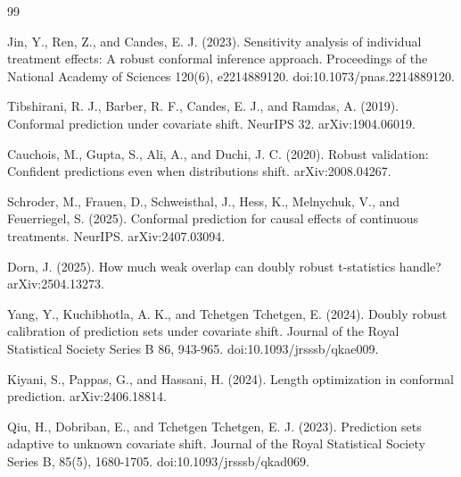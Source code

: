 \documentclass{article}
\begin{document}
\begin{thebibliography}{99}

   Jin, Y., Ren, Z., and Candes, E. J. (2023). Sensitivity analysis of individual treatment effects: A robust conformal inference approach. Proceedings of the National Academy of Sciences 120(6), e2214889120. doi:10.1073/pnas.2214889120.

   Tibshirani, R. J., Barber, R. F., Candes, E. J., and Ramdas, A. (2019). Conformal prediction under covariate shift. NeurIPS 32. arXiv:1904.06019.

   Cauchois, M., Gupta, S., Ali, A., and Duchi, J. C. (2020). Robust validation: Confident predictions even when distributions shift. arXiv:2008.04267.

   Schroder, M., Frauen, D., Schweisthal, J., Hess, K., Melnychuk, V., and Feuerriegel, S. (2025). Conformal prediction for causal effects of continuous treatments. NeurIPS. arXiv:2407.03094.

   Dorn, J. (2025). How much weak overlap can doubly robust t-statistics handle? arXiv:2504.13273.

   Yang, Y., Kuchibhotla, A. K., and Tchetgen Tchetgen, E. (2024). Doubly robust calibration of prediction sets under covariate shift. Journal of the Royal Statistical Society Series B 86, 943-965. doi:10.1093/jrsssb/qkae009.

   Kiyani, S., Pappas, G., and Hassani, H. (2024). Length optimization in conformal prediction. arXiv:2406.18814.

   Qiu, H., Dobriban, E., and Tchetgen Tchetgen, E. J. (2023). Prediction sets adaptive to unknown covariate shift. Journal of the Royal Statistical Society Series B, 85(5), 1680-1705. doi:10.1093/jrsssb/qkad069.

\end{thebibliography}
\end{document}
